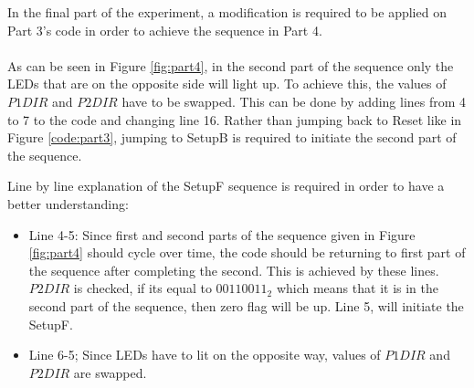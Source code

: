 \documentclass[pdftex,12pt,a4paper]{article}
\begin{document}
\newline{}
In the final part of the experiment, a modification is required to be applied on Part 3's code in order to achieve the sequence in Part 4.
\paragraph{}
As can be seen in Figure \ref{fig:part4}, in the second part of the sequence only the LEDs that are on the opposite side will light up. To achieve this, the values of $P1DIR$ and $P2DIR$ have to be swapped. This can be done by adding lines from 4 to 7 to the code and changing line 16. Rather than jumping back to Reset like in Figure \ref{code:part3}, jumping to SetupB is required to initiate the second part of the sequence.

\newline{}
Line by line explanation of the SetupF sequence is required in order to have a better understanding:

\begin{itemize}
    \item Line 4-5: Since first and second parts of the sequence given in Figure \ref{fig:part4} should cycle over time, the code should be returning to first part of the sequence after completing the second. This is achieved by these lines.  $P2DIR$ is checked, if its equal to $00110011_2$ which means that it is in the second part of the sequence, then zero flag will be up. Line 5, will initiate the SetupF.
    \item Line 6-5; Since LEDs have to lit on the opposite way, values of $P1DIR$ and $P2DIR$ are swapped.
\end{itemize}








     
\end{document}
